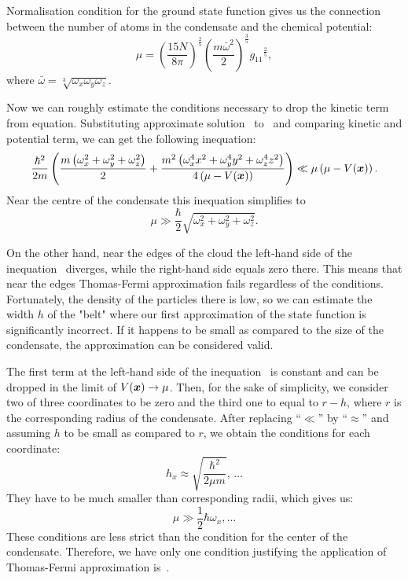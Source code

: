 Normalisation condition for the ground state function gives us the connection
between the number of atoms in the condensate and the chemical potential:
\[
	\mu =
		\left( \frac{15 N}{8 \pi} \right)^\frac{2}{5}
		\left( \frac{m \bar{\omega}^2}{2} \right)^\frac{3}{5}
		{g_{11}}^\frac{2}{5},
\]
where $\bar{\omega} = \sqrt[3]{\omega_x \omega_y \omega_z}$.

Now we can roughly estimate the conditions necessary to drop the kinetic term from equation.
Substituting approximate solution~ to~
and comparing kinetic and potential term, we can get the following inequation:
\begin{equation}
\label{eqn:mean-field:tf-inequation}
	\frac{\hbar^2}{2m} \left(
		\frac{m \left( \omega_x^2 + \omega_y^2 + \omega_z^2 \right)}{2}
		+ \frac{m^2 \left( \omega_x^4 x^2 + \omega_y^4 y^2 + \omega_z^4 z^2 \right)}
			{4 \left( \mu - V(\boldsymbol{x}) \right)}
	\right) \ll
	\mu \left(\mu - V(\boldsymbol{x})\right).
\end{equation}
Near the centre of the condensate this inequation simplifies to
\begin{equation}
\label{eqn:mean-field:tf-condition}
	\mu \gg \frac{\hbar}{2} \sqrt{\omega_x^2 + \omega_y^2 + \omega_z^2}.
\end{equation}

On the other hand, near the edges of the cloud the left-hand side of the inequation~ diverges,
while the right-hand side equals zero there.
This means that near the edges Thomas-Fermi approximation fails regardless of the conditions.
Fortunately, the density of the particles there is low, so we can estimate the width $h$ of the "belt"
where our first approximation of the state function is significantly incorrect.
If it happens to be small as compared to the size of the condensate, the approximation can be considered valid.

The first term at the left-hand side of the inequation~
is constant and can be dropped in the limit of $V(\boldsymbol{x}) \rightarrow \mu$.
Then, for the sake of simplicity, we consider two of three coordinates to be zero and the third one to equal to $r - h$,
where $r$ is the corresponding radius of the condensate.
After replacing ``$\ll$'' by ``$\approx$'' and assuming $h$ to be small as compared to $r$,
we obtain the conditions for each coordinate:
\[
	h_x \approx \sqrt{\frac{\hbar^2}{2 \mu m}},\,\ldots
\]
They have to be much smaller than corresponding radii, which gives us:
\[
	\mu \gg \frac{1}{2} \hbar \omega_x,\ldots
\]
These conditions are less strict than the condition for the center of the condensate.
Therefore, we have only one condition justifying the application of Thomas-Fermi approximation is~.

